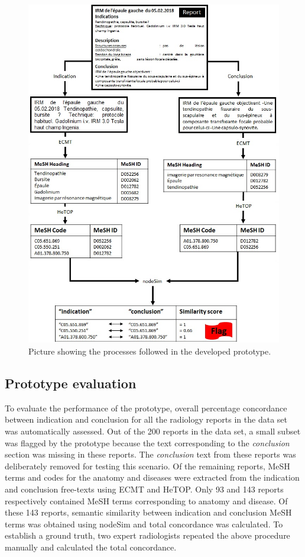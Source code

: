 \documentclass{IOS-Book-Article}
\begin{document}
\begin{figure}
    \centering
    \includegraphics[scale=0.4]{FlowChart.jpg}
    \caption{Picture showing the processes followed in the developed prototype.}
    \label{fig:flowchart}
\end{figure}
%
\subsection{Prototype evaluation}
%
To evaluate the performance of the prototype, overall percentage concordance between indication and conclusion for all the radiology reports in the data set was automatically assessed.
Out of the 200 reports in the data set, a small subset was flagged by the prototype because the text corresponding to the \emph{conclusion} section was missing in these reports.
The \emph{conclusion} text from these reports was deliberately removed for testing this scenario.
Of the remaining reports, MeSH terms and codes for the anatomy and diseases were extracted from the indication and conclusion free-texts using ECMT and HeTOP.
Only 93 and 143 reports respectively contained MeSH terms corresponding to anatomy and disease.
Of these 143 reports, semantic similarity between indication and conclusion MeSH terms was obtained using nodeSim and total concordance was calculated.
To establish a ground truth, two expert radiologists repeated the above procedure manually and calculated the total concordance.
\end{document}
